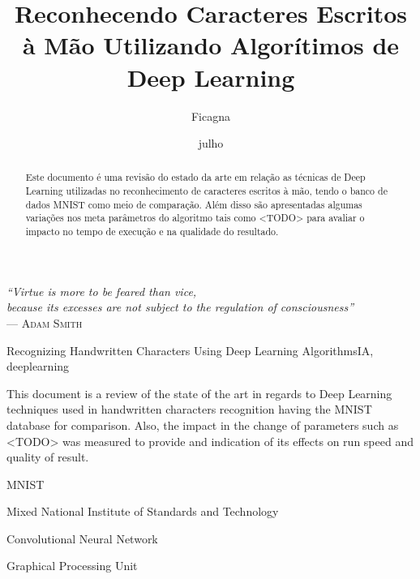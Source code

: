 \documentclass[cic,tc]{iiufrgs}
\title{Reconhecendo Caracteres Escritos à Mão Utilizando Algorítimos de Deep Learning}
\author{Ficagna}{Alan}
\date{julho}{2015}
\begin{document}
\maketitle

\clearpage
\begin{flushright}
  \mbox{}\vfill
  {\sffamily\itshape{}
    ``Virtue is more to be feared than vice,\\
    because its excesses are not subject to the regulation of consciousness''\\}
  --- \textsc{Adam Smith}
\end{flushright}

\begin{abstract}

  Este documento é uma revisão do estado da arte em relação as técnicas de
Deep Learning utilizadas no reconhecimento de caracteres escritos à mão, tendo o
banco de dados MNIST como meio de comparação. Além disso são apresentadas
algumas variações nos meta parâmetros do algoritmo tais como <TODO> para
avaliar o impacto no tempo de execução e na qualidade do resultado.
\end{abstract}

\begin{englishabstract}{Recognizing Handwritten Characters Using Deep Learning Algorithms}{IA, deeplearning} %

  This document is a review of the state of the art in regards to Deep Learning
techniques used in handwritten characters recognition having the MNIST
database for comparison. Also, the impact in the change of parameters such as
<TODO> was measured to provide and indication of its effects on run speed and
quality of result.

\end{englishabstract}

\listoffigures
\listoftables
\begin{listofabbrv}{MNIST} %
 \item[MNIST] Mixed National Institute of Standards and Technology
 \item[CNN] Convolutional Neural Network
 \item[GPU] Graphical Processing Unit
\end{listofabbrv}
\tableofcontents

\end{document}
